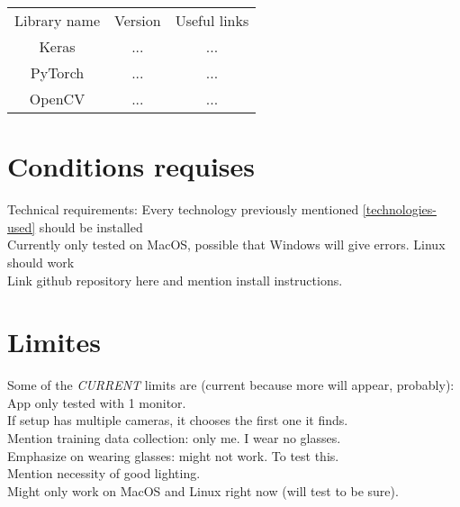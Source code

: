 \begin{center}
    \begin{tabular}{ c c c }
        Library name & Version & Useful links \\
        Keras & ... & ... \\
        PyTorch & ... & ... \\
        OpenCV & ... & ...
    \end{tabular}
\end{center}

\section{Conditions requises}
Technical requirements: Every technology previously mentioned \ref{technologies-used} should be installed \\

Currently only tested on MacOS, possible that Windows will give errors. Linux should work\\

Link github repository here and mention install instructions.\\

\section{Limites}
Some of the \emph{CURRENT} limits are (current because more will appear, probably):
App only tested with 1 monitor.\\
If setup has multiple cameras, it chooses the first one it finds.\\
Mention training data collection: only me. I wear no glasses.\\
Emphasize on wearing glasses: might not work. To test this.\\

Mention necessity of good lighting.\\

Might only work on MacOS and Linux right now (will test to be sure).
